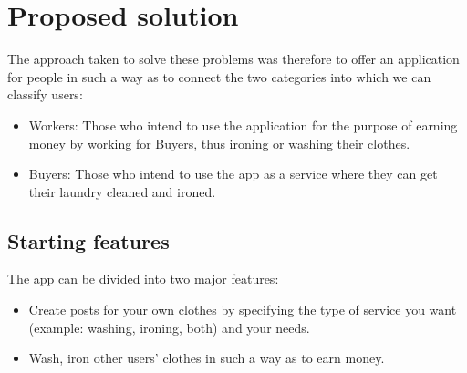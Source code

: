 \section{Proposed solution}
The approach taken to solve these problems was therefore to offer an application for people in such a way as to connect the two categories into which we can classify users:
\begin{itemize}
\item Workers: Those who intend to use the application for the purpose of earning money by working for Buyers, thus ironing or washing their clothes.
\item Buyers: Those who intend to use the app as a service where they can get their laundry cleaned and ironed.
\end{itemize}
\subsection{Starting features}
The app can be divided into two major features:
\begin{itemize}
\item Create posts for your own clothes by specifying the type of service you want (example: washing, ironing, both) and your needs.
\item Wash, iron other users' clothes in such a way as to earn money.
\end{itemize}
